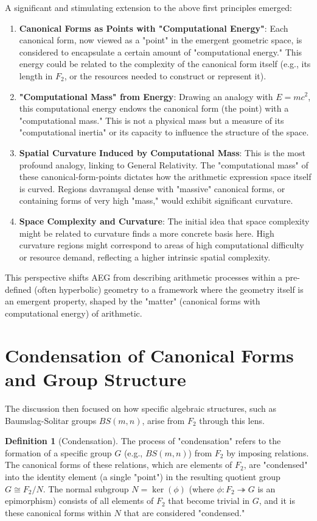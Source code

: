 \documentclass[12pt, a4paper]{article}
\theoremstyle{definition}
\newtheorem{definition}{Definition}[section]
\begin{document}
A significant and stimulating extension to the above first principles emerged:

\begin{enumerate}
    \item \textbf{Canonical Forms as Points with "Computational Energy"}: Each canonical form, now viewed as a "point" in the emergent geometric space, is considered to encapsulate a certain amount of "computational energy." This energy could be related to the complexity of the canonical form itself (e.g., its length in $F_2$, or the resources needed to construct or represent it).
    \item \textbf{"Computational Mass" from Energy}: Drawing an analogy with $E=mc^2$, this computational energy endows the canonical form (the point) with a "computational mass." This is not a physical mass but a measure of its "computational inertia" or its capacity to influence the structure of the space.
    \item \textbf{Spatial Curvature Induced by Computational Mass}: This is the most profound analogy, linking to General Relativity. The "computational mass" of these canonical-form-points dictates how the arithmetic expression space itself is curved. Regions davranışsal dense with "massive" canonical forms, or containing forms of very high "mass," would exhibit significant curvature.
    \item \textbf{Space Complexity and Curvature}: The initial idea that space complexity might be related to curvature finds a more concrete basis here. High curvature regions might correspond to areas of high computational difficulty or resource demand, reflecting a higher intrinsic spatial complexity.
\end{enumerate}
This perspective shifts AEG from describing arithmetic processes within a pre-defined (often hyperbolic) geometry to a framework where the geometry itself is an emergent property, shaped by the "matter" (canonical forms with computational energy) of arithmetic.

\section{Condensation of Canonical Forms and Group Structure}
The discussion then focused on how specific algebraic structures, such as Baumslag-Solitar groups $BS(m,n)$, arise from $F_2$ through this lens.

\begin{definition}[Condensation]
The process of "condensation" refers to the formation of a specific group $G$ (e.g., $BS(m,n)$) from $F_2$ by imposing relations. The canonical forms of these relations, which are elements of $F_2$, are "condensed" into the identity element (a single "point") in the resulting quotient group $G \cong F_2/N$. The normal subgroup $N = \ker(\phi)$ (where $\phi: F_2 \twoheadrightarrow G$ is an epimorphism) consists of all elements of $F_2$ that become trivial in $G$, and it is these canonical forms within $N$ that are considered "condensed."
\end{definition}
\end{document}

